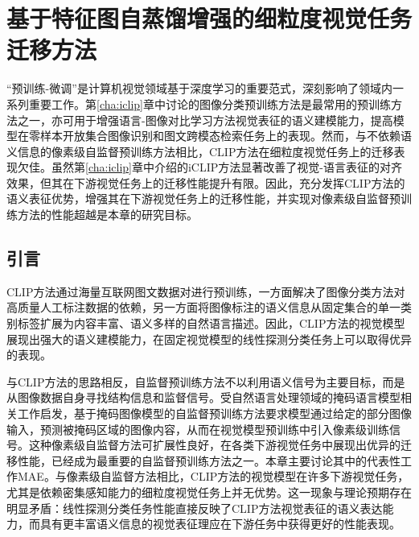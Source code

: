 \chapter{基于特征图自蒸馏增强的细粒度视觉任务迁移方法}
\label{cha:fd}

“预训练-微调”是计算机视觉领域基于深度学习的重要范式，深刻影响了领域内一系列重要工作\cite{HinSal06,alexnet,rcnn13,long2015fully}。第\ref{cha:iclip}章中讨论的图像分类预训练方法是最常用的预训练方法之一，亦可用于增强语言-图像对比学习方法视觉表征的语义建模能力，提高模型在零样本开放集合图像识别和图文跨模态检索任务上的表现。然而，与不依赖语义信息的像素级自监督预训练方法\cite{he2022masked}相比，CLIP方法在细粒度视觉任务上的迁移表现欠佳。虽然第\ref{cha:iclip}章中介绍的iCLIP方法显著改善了视觉-语言表征的对齐效果，但其在下游视觉任务上的迁移性能提升有限。因此，充分发挥CLIP方法的语义表征优势，增强其在下游视觉任务上的迁移性能，并实现对像素级自监督预训练方法的性能超越是本章的研究目标。



\section{引言}
\label{sec:fd-intro}

CLIP方法通过海量互联网图文数据对进行预训练，一方面解决了图像分类方法对高质量人工标注数据的依赖，另一方面将图像标注的语义信息从固定集合的单一类别标签扩展为内容丰富、语义多样的自然语言描述。因此，CLIP方法的视觉模型展现出强大的语义建模能力，在固定视觉模型的线性探测分类任务上可以取得优异的表现。%

与CLIP方法的思路相反，自监督预训练方法不以利用语义信号为主要目标，而是从图像数据自身寻找结构信息和监督信号。受自然语言处理领域的掩码语言模型\cite{BERT}相关工作启发，基于掩码图像模型\cite{bao2021beit, xie2022simmim, he2022masked}的自监督预训练方法要求模型通过给定的部分图像输入，预测被掩码区域的图像内容，从而在视觉模型预训练中引入像素级训练信号。这种像素级自监督方法可扩展性良好，在各类下游视觉任务中展现出优异的迁移性能，已经成为最重要的自监督预训练方法之一。本章主要讨论其中的代表性工作MAE\cite{he2022masked}。与像素级自监督方法相比，CLIP方法的视觉模型在许多下游视觉任务，尤其是依赖密集感知能力的细粒度视觉任务上并无优势。这一现象与理论预期存在明显矛盾：线性探测分类任务性能直接反映了CLIP方法视觉表征的语义表达能力，而具有更丰富语义信息的视觉表征理应在下游任务中获得更好的性能表现。

